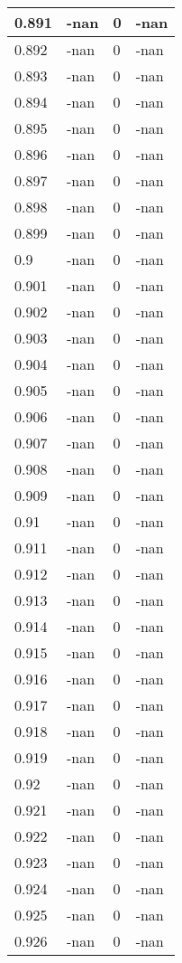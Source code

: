\documentclass[a4paper,14pt]{extarticle}
\begin{document}
\begin{longtable}{||m{3cm}||m{3cm}|m{3cm}||m{3cm}||}
\hline
0.891 & -nan & 0 & -nan\\
\hline
0.892 & -nan & 0 & -nan\\
\hline
0.893 & -nan & 0 & -nan\\
\hline
0.894 & -nan & 0 & -nan\\
\hline
0.895 & -nan & 0 & -nan\\
\hline
0.896 & -nan & 0 & -nan\\
\hline
0.897 & -nan & 0 & -nan\\
\hline
0.898 & -nan & 0 & -nan\\
\hline
0.899 & -nan & 0 & -nan\\
\hline
0.9 & -nan & 0 & -nan\\
\hline
0.901 & -nan & 0 & -nan\\
\hline
0.902 & -nan & 0 & -nan\\
\hline
0.903 & -nan & 0 & -nan\\
\hline
0.904 & -nan & 0 & -nan\\
\hline
0.905 & -nan & 0 & -nan\\
\hline
0.906 & -nan & 0 & -nan\\
\hline
0.907 & -nan & 0 & -nan\\
\hline
0.908 & -nan & 0 & -nan\\
\hline
0.909 & -nan & 0 & -nan\\
\hline
0.91 & -nan & 0 & -nan\\
\hline
0.911 & -nan & 0 & -nan\\
\hline
0.912 & -nan & 0 & -nan\\
\hline
0.913 & -nan & 0 & -nan\\
\hline
0.914 & -nan & 0 & -nan\\
\hline
0.915 & -nan & 0 & -nan\\
\hline
0.916 & -nan & 0 & -nan\\
\hline
0.917 & -nan & 0 & -nan\\
\hline
0.918 & -nan & 0 & -nan\\
\hline
0.919 & -nan & 0 & -nan\\
\hline
0.92 & -nan & 0 & -nan\\
\hline
0.921 & -nan & 0 & -nan\\
\hline
0.922 & -nan & 0 & -nan\\
\hline
0.923 & -nan & 0 & -nan\\
\hline
0.924 & -nan & 0 & -nan\\
\hline
0.925 & -nan & 0 & -nan\\
\hline
0.926 & -nan & 0 & -nan\\

\end{longtable}
\end{document}
